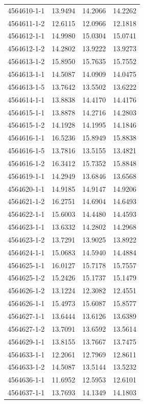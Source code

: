 \begin{longtable}{lrrr}
4564610-1-1 & 13.9494 & 14.2066 & 14.2262 \\
4564611-1-2 & 12.6115 & 12.0966 & 12.1818 \\
4564612-1-1 & 14.9980 & 15.0304 & 15.0741 \\
4564612-1-2 & 14.2802 & 13.9222 & 13.9273 \\
4564613-1-2 & 15.8950 & 15.7635 & 15.7552 \\
4564613-1-1 & 14.5087 & 14.0909 & 14.0475 \\
4564613-1-5 & 13.7642 & 13.5502 & 13.6222 \\
4564614-1-1 & 13.8838 & 14.4170 & 14.4176 \\
4564615-1-1 & 13.8878 & 14.2716 & 14.2803 \\
4564615-1-2 & 14.1928 & 14.1995 & 14.1846 \\
4564616-1-1 & 16.5236 & 15.8949 & 15.8838 \\
4564616-1-5 & 13.7816 & 13.5155 & 13.4821 \\
4564616-1-2 & 16.3412 & 15.7352 & 15.8848 \\
4564619-1-1 & 14.2949 & 13.6846 & 13.6568 \\
4564620-1-1 & 14.9185 & 14.9147 & 14.9206 \\
4564621-1-2 & 16.2751 & 14.6904 & 14.6493 \\
4564622-1-1 & 15.6003 & 14.4480 & 14.4593 \\
4564623-1-1 & 13.6332 & 14.2802 & 14.2968 \\
4564623-1-2 & 13.7291 & 13.9025 & 13.8922 \\
4564624-1-1 & 15.0683 & 14.5940 & 14.4884 \\
4564625-1-1 & 16.0127 & 15.7178 & 15.7557 \\
4564625-1-2 & 15.2426 & 15.1737 & 15.1479 \\
4564626-1-2 & 13.1224 & 12.3082 & 12.4551 \\
4564626-1-1 & 15.4973 & 15.6087 & 15.8577 \\
4564627-1-1 & 13.6444 & 13.6126 & 13.6389 \\
4564627-1-2 & 13.7091 & 13.6592 & 13.5614 \\
4564629-1-1 & 13.8155 & 13.7667 & 13.7475 \\
4564633-1-1 & 12.2061 & 12.7969 & 12.8611 \\
4564633-1-2 & 14.5087 & 13.5144 & 13.5232 \\
4564636-1-1 & 11.6952 & 12.5953 & 12.6101 \\
4564637-1-1 & 13.7693 & 14.1349 & 14.1803 \\

\end{longtable}
